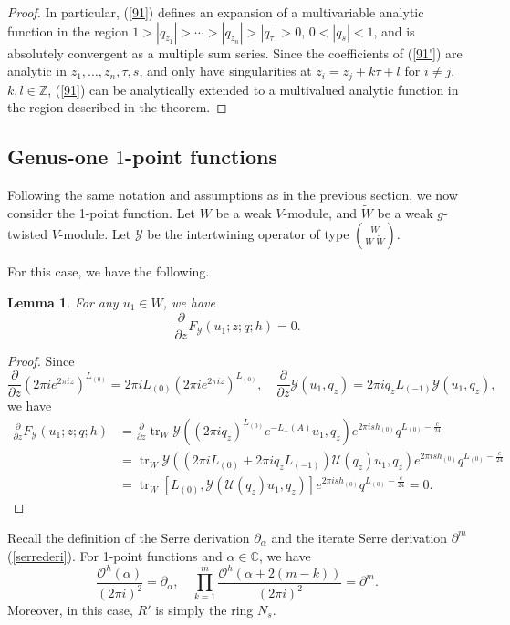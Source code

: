 \documentclass[9pt]{amsart}
\newtheorem{lemma}{Lemma}[section]
\begin{document}
\begin{proof}
In particular, (\ref{91}) defines an expansion of a multivariable analytic function in the region $1 > |q_{z_1}| > \cdots > |q_{z_n}| > |q_\tau| > 0$, $0 < |q_s| < 1$, and is absolutely convergent as a multiple sum series. Since the coefficients of (\ref{91'}) are analytic in $z_1, \dots, z_n, \tau, s$, and only have singularities at $z_i = z_j + k\tau + l$ for $i \neq j$, $k, l \in \mathbb{Z}$, (\ref{91}) can be analytically extended to a multivalued analytic function in the region described in the theorem.
\end{proof}

\subsection{Genus-one $1$-point functions}
Following the same notation and assumptions as in the previous section, we now consider the 1-point function. Let $W$ be a weak $V$-module, and  $\tilde{W}$ be a weak $g$-twisted $V$-module. Let $\mathcal{Y}$ be the intertwining operator of type $\binom{\tilde{W}}{W\; \tilde{W}}$.

 For this case, we have the following. 
\begin{lemma}For any $u_1\in W$, we have
\[
\frac{\partial}{\partial z}F_{\mathcal{Y}}(u_1; z; q; h) = 0.
\]
\end{lemma}

\begin{proof}
Since
\[
\frac{\partial}{\partial z}(2\pi i e^{2\pi i z})^{L_{(0)}} = 2\pi i L_{(0)} (2\pi i e^{2\pi i z})^{L_{(0)}},
\quad
\frac{\partial}{\partial z} \mathcal{Y}(u_1, q_z) = 2\pi i q_z L_{(-1)} \mathcal{Y}(u_1, q_z),
\]
we have
\begin{align*}
\frac{\partial}{\partial z} F_{\mathcal{Y}}(u_1; z; q; h)
&= \frac{\partial}{\partial z} \operatorname{tr}_{W} \mathcal{Y}((2\pi i q_z)^{L_{(0)}} e^{-L_{+}(A)} u_1, q_z) e^{2\pi i s h_{(0)}} q^{L_{(0)} - \frac{c}{24}} \\
&= \operatorname{tr}_{W} \mathcal{Y}((2\pi i L_{(0)} + 2\pi i q_z L_{(-1)}) \mathcal{U}(q_z) u_1, q_z) e^{2\pi i s h_{(0)}} q^{L_{(0)} - \frac{c}{24}} \\
&= \operatorname{tr}_{W} [L_{(0)}, \mathcal{Y}(\mathcal{U}(q_z) u_1, q_z)] e^{2\pi i s h_{(0)}} q^{L_{(0)} - \frac{c}{24}} = 0.
\end{align*}
\end{proof}

\noindent
Recall the definition of the {\rm Serre derivation} $\partial_{\alpha}$ and the {\rm iterate Serre derivation} $\partial^m$ (\ref{serrederi}). For 1-point functions and $\alpha \in \mathbb{C}$, we have
\[
\frac{\mathcal{O}^{h}(\alpha)}{(2\pi i)^2} = \partial_\alpha,
\quad
\prod_{k=1}^{m} \frac{\mathcal{O}^{h}(\alpha + 2(m - k))}{(2\pi i)^2} = \partial^m.
\]
Moreover, in this case, $R'$ is simply the ring $N_s$.
\end{document}
